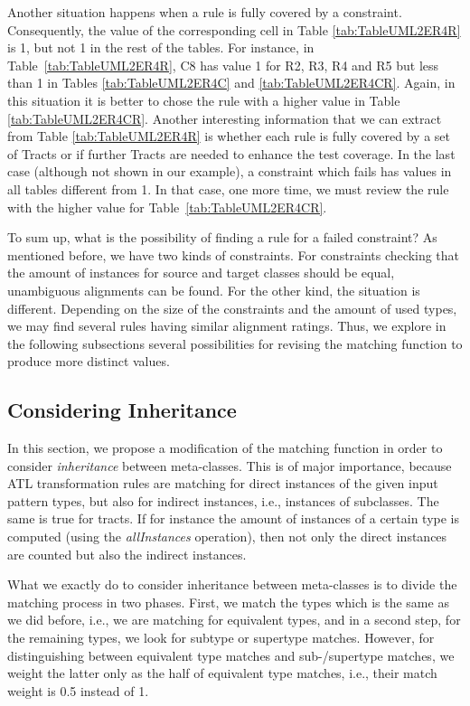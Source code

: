 Another situation happens when a rule is fully covered by a constraint. Consequently, the value of the corresponding cell in Table \ref{tab:TableUML2ER4R} is 1, but not 1 in the rest of the tables. For instance, in Table~\ref{tab:TableUML2ER4R}, C8 has value 1 for R2, R3, R4 and R5 but less than 1 in Tables \ref{tab:TableUML2ER4C} and \ref{tab:TableUML2ER4CR}. Again, in this situation it is better to chose the rule with a higher value in Table \ref{tab:TableUML2ER4CR}. Another interesting information that we can extract from Table \ref{tab:TableUML2ER4R} is whether each rule is fully covered by a set of Tracts or if further Tracts are needed to enhance the test coverage.
In the last case (although not shown in our example), a constraint which fails has values in all tables different from 1. In that case, one more time, we must review the rule with the higher value for Table~\ref{tab:TableUML2ER4CR}.

To sum up, what is the possibility of finding a rule for a failed constraint? As mentioned before, we have two kinds of constraints. For constraints checking that the amount of instances for source and target classes should be equal, unambiguous alignments can be found. For the other kind, the situation is different. Depending on the size of the constraints and the amount of used types, we may find several rules having similar alignment ratings. Thus, we explore in the following subsections several possibilities for revising the matching function to produce more distinct values.

\subsection{Considering Inheritance}

In this section, we propose a modification of the matching function in order to consider \emph{inheritance} between meta-classes. This is of major importance, because ATL transformation rules are matching for direct instances of the given input pattern types, but also for indirect instances, i.e., instances of subclasses. The same is true for tracts. If for instance the amount of instances of a certain type is computed (using the \emph{allInstances} operation), then not only the direct instances are counted but also the indirect instances.

What we exactly do to consider inheritance between meta-classes is to divide the matching process in two phases. First, we match the types which is the same as we did before, i.e., we are matching for equivalent types, and in a second step, for the remaining types, we look for subtype or supertype matches. However, for distinguishing between equivalent type matches and sub-/supertype matches, we weight the latter only as the half of equivalent type matches, i.e., their match weight is 0.5 instead of 1.

